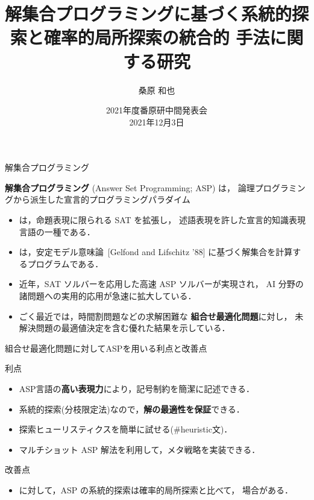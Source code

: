 \documentclass[11pt,dvipdfmx]{beamer}
\title{解集合プログラミングに基づく系統的探索と確率的局所探索の統合的
  手法に関する研究}
\date{2021年度番原研中間発表会\\2021年12月3日}
\institute{番原研究室}
\author{桑原 和也}
\begin{document}
\maketitle
\begin{frame}{解集合プログラミング}
  \begin{alertblock}{}\centering
    \alert{\bf 解集合プログラミング} (Answer Set Programming; ASP) は，
    論理プログラミングから派生した宣言的プログラミングパラダイム
  \end{alertblock}
  \bigskip
  \begin{itemize}
  \item {}は，命題表現に限られる SAT を拡張し，
    述語表現を許した宣言的知識表現言語の一種である．
  \item {}は，安定モデル意味論~[Gelfond and Lifschitz '88]
    に基づく解集合を計算するプログラムである．
  \item 近年，SAT ソルバーを応用した高速 ASP ソルバーが実現され，
    AI 分野の諸問題への実用的応用が急速に拡大している．
  \item ごく最近では，時間割問題などの求解困難な
    \alert{\bf 組合せ最適化問題}に対し，
    未解決問題の最適値決定を含む優れた結果を示している．
  \end{itemize}
\end{frame}
\begin{frame}{組合せ最適化問題に対してASPを用いる利点と改善点}
  \begin{alertblock}{利点}
    \begin{itemize}
    \item ASP言語の\alert{\bf 高い表現力}により，記号制約を簡潔に記述できる．
    \item 系統的探索(分枝限定法)なので，\alert{\bf 解の最適性を保証}できる．
    \item 探索ヒューリスティクスを簡単に試せる(\textsf{\#heuristic}文)．
    \item マルチショット ASP 解法を利用して，メタ戦略を実装できる．
    \end{itemize}
  \end{alertblock}
  \bigskip
  \begin{block}{改善点}
    \begin{itemize}
    \item {}に対して，ASP の系統的探索は確率的局所探索と比べて，
      場合がある．
    \end{itemize}
  \end{block}
\end{frame}
\end{document}
